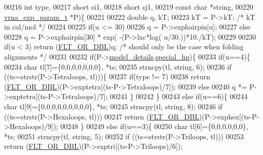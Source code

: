 \begin{DoxyCode}
00216               \textcolor{keywordtype}{int} type,
00217               \textcolor{keywordtype}{short} si1,
00218               \textcolor{keywordtype}{short} sj1,
00219               \textcolor{keyword}{const} \textcolor{keywordtype}{char} *\textcolor{keywordtype}{string},
00220               \hyperlink{group__energy__parameters_structvrna__exp__param__s}{vrna\_exp\_param\_t} *P)\{
00221 
00222   \textcolor{keywordtype}{double} q, kT;
00223   kT = P->kT;   \textcolor{comment}{/* kT in cal/mol  */}
00224 
00225   \textcolor{keywordflow}{if}(u <= 30)
00226     q = P->exphairpin[u];
00227   \textcolor{keywordflow}{else}
00228     q = P->exphairpin[30] * exp( -(P->lxc*log( u/30.))*10./kT);
00229 
00230   \textcolor{keywordflow}{if}(u < 3) \textcolor{keywordflow}{return} (\hyperlink{group__data__structures_ga31125aeace516926bf7f251f759b6126}{FLT\_OR\_DBL})q; \textcolor{comment}{/* should only be the case when folding alignments */}
00231 
00232   \textcolor{keywordflow}{if}(P->\hyperlink{group__energy__parameters_ac18055127bccc27c1223f1d2f3b01b53}{model\_details}.\hyperlink{group__model__details_add64a96d23e77ef1d0ddf8dfc5228143}{special\_hp})\{
00233     \textcolor{keywordflow}{if}(u==4)\{
00234       \textcolor{keywordtype}{char} tl[7]=\{0,0,0,0,0,0,0\}, *ts;
00235       strncpy(tl, \textcolor{keywordtype}{string}, 6);
00236       \textcolor{keywordflow}{if} ((ts=strstr(P->Tetraloops, tl)))\{
00237         \textcolor{keywordflow}{if}(type != 7)
00238           \textcolor{keywordflow}{return} (\hyperlink{group__data__structures_ga31125aeace516926bf7f251f759b6126}{FLT\_OR\_DBL})(P->exptetra[(ts-P->Tetraloops)/7]);
00239         \textcolor{keywordflow}{else}
00240           q *= P->exptetra[(ts-P->Tetraloops)/7];
00241       \}
00242     \}
00243     \textcolor{keywordflow}{else} \textcolor{keywordflow}{if}(u==6)\{
00244       \textcolor{keywordtype}{char} tl[9]=\{0,0,0,0,0,0,0,0,0\}, *ts;
00245       strncpy(tl, \textcolor{keywordtype}{string}, 8);
00246       \textcolor{keywordflow}{if} ((ts=strstr(P->Hexaloops, tl)))
00247         \textcolor{keywordflow}{return}  (\hyperlink{group__data__structures_ga31125aeace516926bf7f251f759b6126}{FLT\_OR\_DBL})(P->exphex[(ts-P->Hexaloops)/9]);
00248     \}
00249     \textcolor{keywordflow}{else} \textcolor{keywordflow}{if}(u==3)\{
00250       \textcolor{keywordtype}{char} tl[6]=\{0,0,0,0,0,0\}, *ts;
00251       strncpy(tl, \textcolor{keywordtype}{string}, 5);
00252       \textcolor{keywordflow}{if} ((ts=strstr(P->Triloops, tl)))
00253         \textcolor{keywordflow}{return} (\hyperlink{group__data__structures_ga31125aeace516926bf7f251f759b6126}{FLT\_OR\_DBL})(P->exptri[(ts-P->Triloops)/6]);

\end{DoxyCode}
